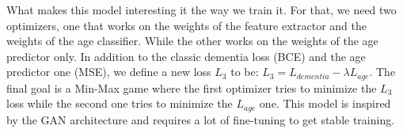 What makes this model interesting it the way we train it. For that, we need two optimizers, one that works on the weights of the feature extractor and the weights of the age classifier. While the other works on the weights of the age predictor only. In addition to the classic dementia loss (BCE) and the age predictor one (MSE), we define a new loss $L_{3}$ to be: $L_3 = L_{dementia} - \lambda L_{age}$. The final goal is a Min-Max game where the first optimizer tries to minimize the $L_3$ loss while the second one tries to minimize the $L_{age}$ one. This model is inspired by the GAN\cite{goodfellow2014generative} architecture and requires a lot of fine-tuning to get stable training.